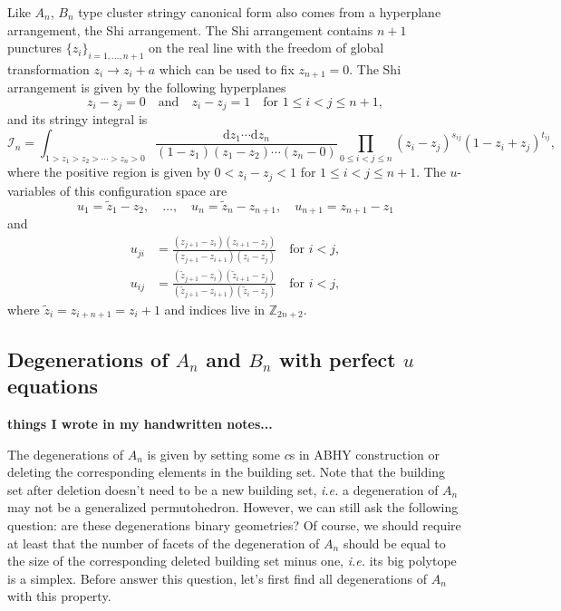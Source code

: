\documentclass[hidelinks,12pt]{article}
\begin{document}

Like $A_n$, $B_n$ type cluster stringy canonical form also comes from a hyperplane 
arrangement, the Shi arrangement. The Shi arrangement contains $n+1$ punctures 
$\{z_i\}_{i=1,\dots,n+1}$ on the real line with the freedom of global transformation 
$z_i\to z_i+a$ which can be used to fix $z_{n+1}=0$. The Shi arrangement is 
given by the following hyperplanes
\[
	z_i-z_j=0\quad \text{and}\quad z_i-z_j=1\quad \text{for $1\leq i<j\leq n+1$},
\]
and its stringy integral is 
\[
\mathcal I_n = \int_{1>z_1>z_2>\cdots >z_n>0}
\frac{\mathrm dz_1\cdots \mathrm dz_{n}}{(1-z_1)(z_1-z_2)\cdots (z_{n}-0)}
\prod_{0\leq i<j \leq n}(z_i-z_j)^{s_{ij}}(1-z_i+z_j)^{t_{ij}},
\]
where the positive region is given by $0<z_i-z_j<1$ for $1\leq i<j \leq n+1$.
The $u$-variables of this configuration space are
\[
    u_1=\tilde z_1-z_2,\quad \dots,\quad u_{n}=\tilde z_{n}-z_{n+1},
    \quad u_{n+1}=z_{n+1}-z_1
\]
and 
\begin{align*}
    u_{ji}&=\frac{(z_{j+1}-z_{i})(z_{i+1}-z_j)}{(z_{j+1}-z_{i+1})(z_i-z_j)}\quad \text{for $i<j$},\\
    u_{ij}&=\frac{(\tilde z_{j+1}-z_{i})(\tilde z_{i+1}-z_j)}{(\tilde z_{j+1}-z_{i+1})(\tilde z_i-z_j)}\quad \text{for $i<j$},
\end{align*}
where $\tilde{z}_i=z_{i+n+1}=z_{i}+1$ and indices live in $\mathbb Z_{2n+2}$.

\subsection{Degenerations of $A_n$ and $B_n$ with perfect $u$ equations} 

{\bf things I wrote in my handwritten notes...}

The degenerations of $A_n$ is given by setting some $c$s in ABHY construction or deleting the corresponding elements in the building set. Note that the building set after deletion doesn't need to be a new building set, \emph{i.e.} a degeneration of $A_n$ may not be a generalized permutohedron. However, we can still ask the following question: are these degenerations binary geometries? 
Of course, we should require at least that the number of facets of the degeneration of $A_n$ should be equal to the size of the corresponding deleted building set minus one, \emph{i.e.} its big polytope is a simplex.
Before answer this question, let's first find all degenerations of $A_n$ with this property.
\end{document}
